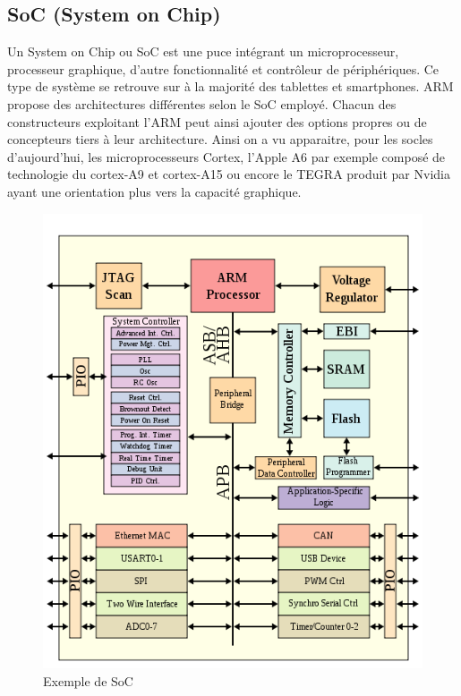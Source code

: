 \subsection{ SoC (System on Chip) }

Un System on Chip ou SoC est une puce intégrant un microprocesseur, processeur graphique, d'autre fonctionnalité et contrôleur de périphériques. Ce type de système se retrouve sur à la majorité des tablettes et smartphones. ARM propose des architectures différentes selon le SoC employé. Chacun des constructeurs exploitant l'ARM peut ainsi ajouter des options propres ou de concepteurs tiers à leur architecture. Ainsi on a vu apparaitre, pour les socles d'aujourd'hui, les microprocesseurs Cortex, l'Apple A6 par exemple composé de technologie du cortex-A9 et cortex-A15 ou encore le TEGRA produit par Nvidia ayant une orientation plus vers la capacité graphique.

\begin{figure}[h!]
\begin{center}
	\includegraphics[scale=0.9]{ARMSoCBlockDiagram.png}
	\caption{Exemple de SoC}
\end{center}
\end{figure}

